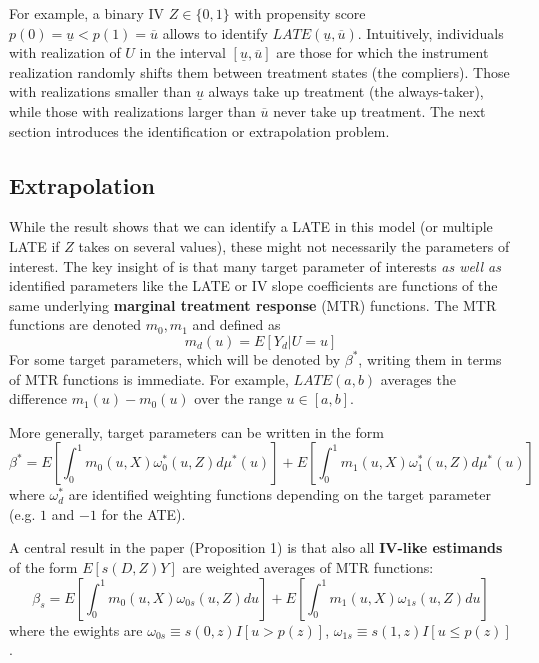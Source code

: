 \documentclass[11pt, a4paper, leqno]{article}
\begin{document}
For example, a binary IV $Z\in\{0,1\}$ with propensity score $p(0) = \underline{u} < p(1) = \overline{u}$ allows to identify $LATE(\underline{u},\overline{u})$.
Intuitively, individuals with realization of $U$ in the interval $[\underline{u}, \overline{u}]$ are those for which the instrument realization randomly shifts them between treatment states (the compliers).
Those with realizations smaller than $\underline{u}$ always take up treatment (the always-taker), while those with realizations larger than $\overline{u}$ never take up treatment.
The next section introduces the identification or extrapolation problem.

\subsection{Extrapolation}
While the \citet{imbens1994identification} result shows that we can identify a LATE in this model (or multiple LATE if $Z$ takes on several values), these might not necessarily the parameters of interest.
The key insight of \citet{mogstad2018using} is that many target parameter of interests \textit{as well as} identified parameters like the LATE or IV slope coefficients are functions of the same underlying \textbf{marginal treatment response} (MTR) functions.
The MTR functions are denoted $m_0, m_1$ and defined as
\begin{equation}
    m_d(u) = E[Y_d|U=u]
\end{equation}
For some target parameters, which will be denoted by $\beta^*$, writing them in terms of MTR functions is immediate.
For example, $LATE(a,b)$ averages the difference $m_1(u) - m_0(u)$ over the range $u\in[a,b]$.

More generally, target parameters can be written in the form
\begin{equation}
    \beta^* = E\left[\int_0^1 m_0(u,X)\omega_0^*(u,Z)d\mu^*(u)\right] + E\left[\int_0^1 m_1(u,X)\omega_1^*(u,Z)d\mu^*(u)\right]
\end{equation}
where $\omega_{d}^*$ are identified weighting functions depending on the target parameter (e.g. $1$ and $-1$ for the ATE).

A central result in the paper (Proposition 1) is that also all \textbf{IV-like estimands} of the form $E[s(D,Z)Y]$ are weighted averages of MTR functions:
\begin{equation}
    \beta_s =
    E\left[\int_0^1 m_0(u,X)\omega_{0s}(u,Z)du\right]
    + E\left[\int_0^1 m_1(u,X)\omega_{1s}(u,Z)du\right]
\end{equation}
where the ewights are $\omega_{0s} \equiv s(0,z)I[u>p(z)]$, $\omega_{1s} \equiv s(1,z)I[u\leq p(z)]$.
\end{document}

